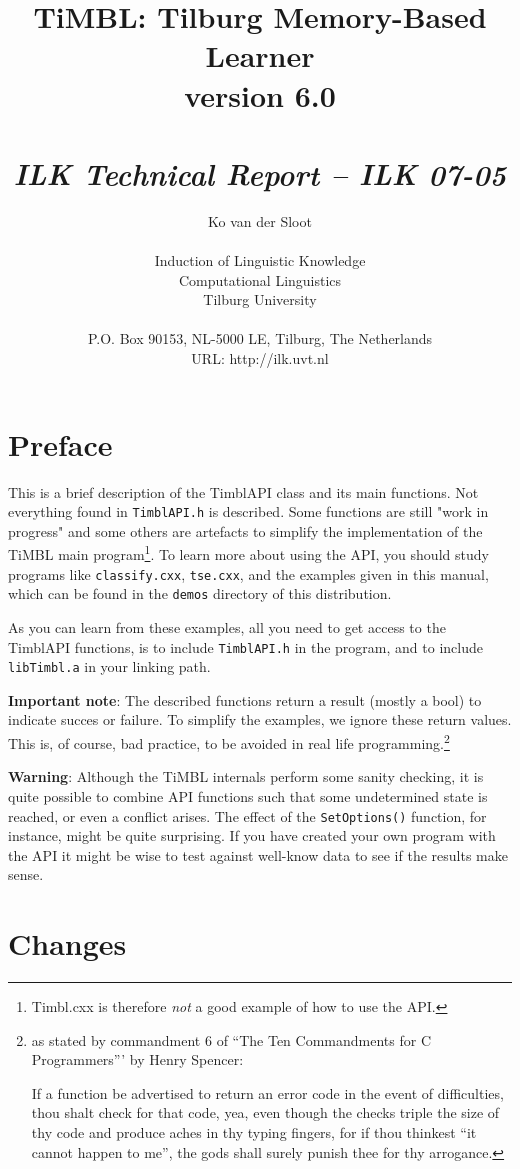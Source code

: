 \documentclass{report}
\author{Ko van der Sloot\\ \ \\ Induction of Linguistic Knowledge\\
        Computational Linguistics\\ Tilburg University \\ \ \\
        P.O. Box 90153, NL-5000 LE, Tilburg, The Netherlands \\ URL:
        http://ilk.uvt.nl}
\title{{\huge TiMBL: Tilburg Memory-Based Learner} \\ \vspace*{0.5cm}
{\bf version 6.0} \\ \vspace*{0.5cm}{\huge API Reference Guide}\\
\vspace*{1cm} {\it ILK Technical Report -- ILK 07-05}}
\begin{document}
\maketitle

\tableofcontents

\chapter*{Preface}

This is a brief description of the TimblAPI class and its main
functions.  Not everything found in {\tt TimblAPI.h} is
described. Some functions are still "work in progress" and some others
are artefacts to simplify the implementation of the TiMBL main
program\footnote{Timbl.cxx is therefore {\em not} a good example of
  how to use the API.}.  To learn more about using the API, you should
study programs like {\tt classify.cxx}, {\tt tse.cxx}, and the
examples given in this manual, which can be found in the {\tt demos}
directory of this distribution.

As you can learn from these examples, all you need to get access to the
TimblAPI functions, is to include {\tt TimblAPI.h} in the program, and to
include {\tt libTimbl.a} in your linking path. 

{\bf Important note}: The described functions return a result (mostly
a bool) to indicate succes or failure. To simplify the examples, we
ignore these return values. This is, of course, bad practice, to be avoided in
real life programming.\footnote{as stated by commandment 6 of ``The
  Ten Commandments for C Programmers''' by Henry Spencer:	

If a function be advertised to return an error code in the event of
difficulties, thou shalt check for that code, yea, even though the
checks triple the size of thy code and produce aches in thy typing
fingers, for if thou thinkest ``it cannot happen to me'', the gods
shall surely punish thee for thy arrogance.}

{\bf Warning}: Although the TiMBL internals perform some sanity
checking, it is quite possible to combine API functions such
that some undetermined state is reached, or even a conflict
arises. The effect of the {\tt SetOptions()} function, for instance,
might be quite surprising. If you have created your own program
with the API it might be wise to test against well-know data to see if
the results make sense.

\chapter{Changes}
\label{changes}
\end{document}
